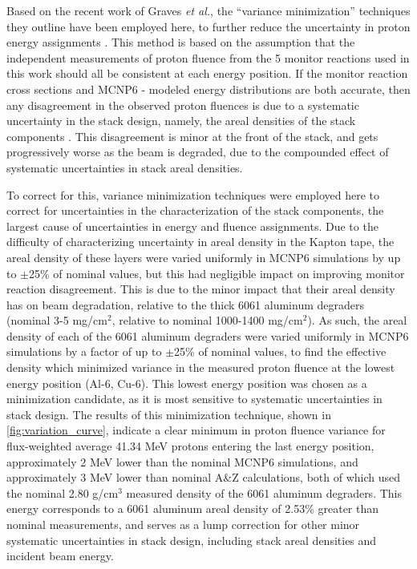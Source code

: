 \documentclass[3p]{elsarticle}
\newcommand{\etal}{\emph{et al.}}
\begin{document}
Based on the recent work of Graves \etal, the \enquote{variance minimization} techniques they outline have been employed here, to further reduce the uncertainty in proton energy assignments     \cite{Graves2016}.
This method is based on the assumption that the independent measurements of proton fluence from the 5 monitor reactions used in this work should all be consistent at each energy position.
If the monitor reaction cross sections and MCNP6 - modeled energy distributions are both accurate, then any disagreement in the  observed proton fluences is due to a systematic uncertainty in the stack design, namely, the areal densities of the stack components \cite{Graves2016,Marus2015}. 
This disagreement is minor at the front of the stack, and gets progressively worse as the beam is degraded, due to the compounded effect of systematic uncertainties in stack areal densities.



To correct for this, variance minimization techniques were employed here to correct for uncertainties in  the characterization of the stack components, the largest cause of uncertainties in energy and  fluence assignments.
Due to the difficulty of characterizing uncertainty in areal density in the Kapton tape, the areal density of these layers were varied uniformly in MCNP6 simulations by up to $\pm$25\% of nominal values, but this had negligible impact on improving monitor reaction disagreement.
This is due to the minor impact that their areal density has on beam degradation, relative to the thick 6061 aluminum degraders (nominal 3-5 mg/cm$^2$, relative to nominal 1000-1400 mg/cm$^2$).
As such,  the areal density of each of the 6061 aluminum degraders  were varied uniformly in MCNP6 simulations  by a factor of up to $\pm$25\% of nominal values, to find the effective density which minimized variance in the measured proton fluence at the lowest energy position (Al-6, Cu-6).
This lowest energy position was chosen as a minimization candidate, as it is most sensitive to systematic uncertainties in stack design.
The results of this minimization technique, shown in \autoref{fig:variation_curve}, indicate a clear minimum in proton fluence variance for flux-weighted average 41.34 MeV protons entering the last energy position, approximately 2 MeV lower than the nominal MCNP6 simulations, and approximately 3 MeV lower than nominal A\&Z calculations, both of which used the nominal 2.80 g/cm$^3$ measured density of the 6061 aluminum degraders.
This energy corresponds to a 6061 aluminum areal density of 2.53\% greater than nominal measurements, and serves as a lump correction for other minor systematic uncertainties in stack design, including stack areal densities and incident beam energy.
\end{document}
